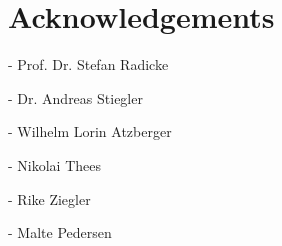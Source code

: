 \chapter{Acknowledgements}

- Prof. Dr. Stefan Radicke

- Dr. Andreas Stiegler

- Wilhelm Lorin Atzberger

- Nikolai Thees

- Rike Ziegler

- Malte Pedersen